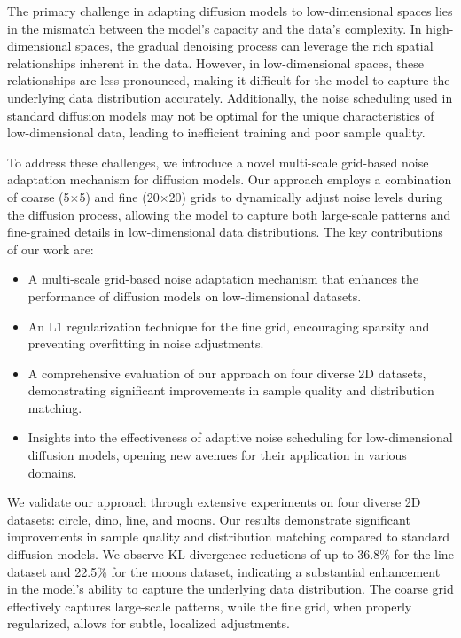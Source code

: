 \documentclass{article} %
\begin{document}
The primary challenge in adapting diffusion models to low-dimensional spaces lies in the mismatch between the model's capacity and the data's complexity. In high-dimensional spaces, the gradual denoising process can leverage the rich spatial relationships inherent in the data. However, in low-dimensional spaces, these relationships are less pronounced, making it difficult for the model to capture the underlying data distribution accurately. Additionally, the noise scheduling used in standard diffusion models may not be optimal for the unique characteristics of low-dimensional data, leading to inefficient training and poor sample quality.

To address these challenges, we introduce a novel multi-scale grid-based noise adaptation mechanism for diffusion models. Our approach employs a combination of coarse (5$\times$5) and fine (20$\times$20) grids to dynamically adjust noise levels during the diffusion process, allowing the model to capture both large-scale patterns and fine-grained details in low-dimensional data distributions. The key contributions of our work are:

\begin{itemize}
    \item A multi-scale grid-based noise adaptation mechanism that enhances the performance of diffusion models on low-dimensional datasets.
    \item An L1 regularization technique for the fine grid, encouraging sparsity and preventing overfitting in noise adjustments.
    \item A comprehensive evaluation of our approach on four diverse 2D datasets, demonstrating significant improvements in sample quality and distribution matching.
    \item Insights into the effectiveness of adaptive noise scheduling for low-dimensional diffusion models, opening new avenues for their application in various domains.
\end{itemize}

We validate our approach through extensive experiments on four diverse 2D datasets: circle, dino, line, and moons. Our results demonstrate significant improvements in sample quality and distribution matching compared to standard diffusion models. We observe KL divergence reductions of up to 36.8\% for the line dataset and 22.5\% for the moons dataset, indicating a substantial enhancement in the model's ability to capture the underlying data distribution. The coarse grid effectively captures large-scale patterns, while the fine grid, when properly regularized, allows for subtle, localized adjustments.
\end{document}
